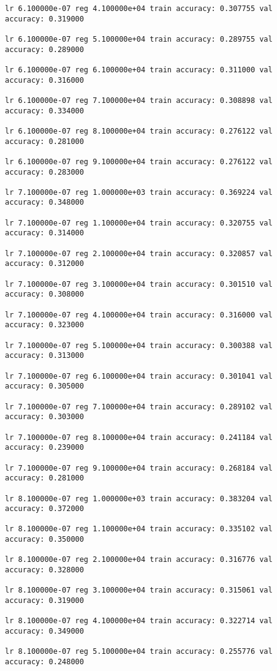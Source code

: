 \documentclass[11pt]{article}
\begin{document}
\begin{Verbatim}[commandchars=\\\{\}]
lr 6.100000e-07 reg 4.100000e+04 train accuracy: 0.307755 val accuracy: 0.319000

lr 6.100000e-07 reg 5.100000e+04 train accuracy: 0.289755 val accuracy: 0.289000

lr 6.100000e-07 reg 6.100000e+04 train accuracy: 0.311000 val accuracy: 0.316000

lr 6.100000e-07 reg 7.100000e+04 train accuracy: 0.308898 val accuracy: 0.334000

lr 6.100000e-07 reg 8.100000e+04 train accuracy: 0.276122 val accuracy: 0.281000

lr 6.100000e-07 reg 9.100000e+04 train accuracy: 0.276122 val accuracy: 0.283000

lr 7.100000e-07 reg 1.000000e+03 train accuracy: 0.369224 val accuracy: 0.348000

lr 7.100000e-07 reg 1.100000e+04 train accuracy: 0.320755 val accuracy: 0.314000

lr 7.100000e-07 reg 2.100000e+04 train accuracy: 0.320857 val accuracy: 0.312000

lr 7.100000e-07 reg 3.100000e+04 train accuracy: 0.301510 val accuracy: 0.308000

lr 7.100000e-07 reg 4.100000e+04 train accuracy: 0.316000 val accuracy: 0.323000

lr 7.100000e-07 reg 5.100000e+04 train accuracy: 0.300388 val accuracy: 0.313000

lr 7.100000e-07 reg 6.100000e+04 train accuracy: 0.301041 val accuracy: 0.305000

lr 7.100000e-07 reg 7.100000e+04 train accuracy: 0.289102 val accuracy: 0.303000

lr 7.100000e-07 reg 8.100000e+04 train accuracy: 0.241184 val accuracy: 0.239000

lr 7.100000e-07 reg 9.100000e+04 train accuracy: 0.268184 val accuracy: 0.281000

lr 8.100000e-07 reg 1.000000e+03 train accuracy: 0.383204 val accuracy: 0.372000

lr 8.100000e-07 reg 1.100000e+04 train accuracy: 0.335102 val accuracy: 0.350000

lr 8.100000e-07 reg 2.100000e+04 train accuracy: 0.316776 val accuracy: 0.328000

lr 8.100000e-07 reg 3.100000e+04 train accuracy: 0.315061 val accuracy: 0.319000

lr 8.100000e-07 reg 4.100000e+04 train accuracy: 0.322714 val accuracy: 0.349000

lr 8.100000e-07 reg 5.100000e+04 train accuracy: 0.255776 val accuracy: 0.248000


\end{Verbatim}
\end{document}
